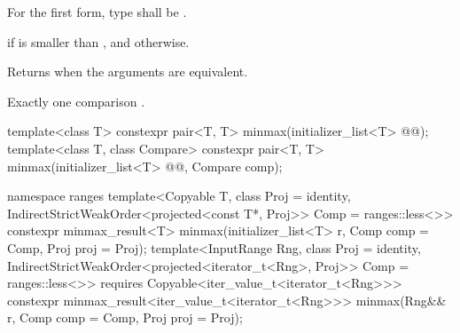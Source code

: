 \begin{itemdescr}
\pnum
\requires
For the first form, type  shall be
.

\pnum
\returns
{}
 if  is smaller
than , and
 otherwise.

\begin{removedblock}
\pnum
\remarks
Returns  when the arguments are equivalent.
\end{removedblock}

\pnum
\complexity
Exactly one comparison .
\end{itemdescr}


%
\begin{itemdecl}
template<class T>
  constexpr pair<T, T> minmax(initializer_list<T> @@);
template<class T, class Compare>
  constexpr pair<T, T> minmax(initializer_list<T> @@, Compare comp);
\end{itemdecl}
\begin{addedblock}
\begin{itemdecl}
namespace ranges {
  template<Copyable T, class Proj = identity,
      IndirectStrictWeakOrder<projected<const T*, Proj>> Comp = ranges::less<>>
    constexpr minmax_result<T>
      minmax(initializer_list<T> r, Comp comp = Comp{}, Proj proj = Proj{});
  template<InputRange Rng, class Proj = identity,
      IndirectStrictWeakOrder<projected<iterator_t<Rng>, Proj>> Comp = ranges::less<>>
    requires Copyable<iter_value_t<iterator_t<Rng>>>
    constexpr minmax_result<iter_value_t<iterator_t<Rng>>>
      minmax(Rng&& r, Comp comp = Comp{}, Proj proj = Proj{});
}
\end{itemdecl}
\end{addedblock}

